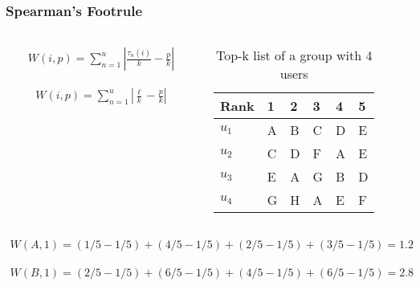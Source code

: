 \begin{frame}[t]
\frametitle{Spearman's Footrule}
\begin{columns}
\begin{column}{0.5\textwidth}
\begin{align*}
W(i,p) = \displaystyle\sum_{n=1}^{u} |\frac{\tau_n(i)}{k} - \frac{p}{k}|
\end{align*}

\begin{align*}
W(i,p) = \displaystyle\sum_{n=1}^{u} |\frac{\ell}{k} - \frac{p}{k}|
\end{align*}
\end{column}
\begin{column}{0.5\textwidth}
\small
\vspace{-0.5cm}
\begin{table}
\captionsetup{font=footnotesize}
\begin{tabular}{|l|lllll|} \hline
Rank  & 1 & 2 & 3 & 4 & 5 \\\hline
$u_1$ & A & B & C & D & E \\
$u_2$ & C & D & F & A & E \\
$u_3$ & E & A & G & B & D \\
$u_4$ & G & H & A & E & F\\\hline
\end{tabular}
\caption{Top-k list of a group with 4 users}
\end{table}
\normalsize
\vspace{1cm}
\end{column}
\end{columns}
\begin{align*}
W(A,1) = (1/5 - 1/5) + (4/5 - 1/5) + (2/5 - 1/5) + (3/5 - 1/5) = 1.2
\end{align*}

\begin{align*}
W(B,1) = (2/5 - 1/5) + (6/5 - 1/5) + (4/5 - 1/5) + (6/5 - 1/5) = 2.8
\end{align*}
\end{frame}

